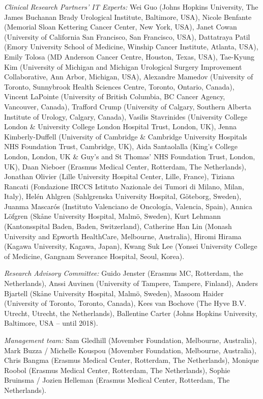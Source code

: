 \emph{Clinical Research Partners’ IT Experts:} Wei Guo (Johns Hopkins University, The James Buchanan Brady Urological Institute, Baltimore, USA), Nicole Benfante (Memorial Sloan Kettering Cancer Center, New York, USA), Janet Cowan (University of California San Francisco, San Francisco, USA), Dattatraya Patil (Emory University School of Medicine, Winship Cancer Institute, Atlanta, USA), Emily Tolosa (MD Anderson Cancer Centre, Houston, Texas, USA), Tae-Kyung Kim (University of Michigan and Michigan Urological Surgery Improvement Collaborative, Ann Arbor, Michigan, USA), Alexandre Mamedov (University of Toronto, Sunnybrook Health Sciences Centre, Toronto, Ontario, Canada), Vincent LaPointe (University of British Columbia, BC Cancer Agency, Vancouver, Canada), Trafford Crump (University of Calgary, Southern Alberta Institute of Urology, Calgary, Canada), Vasilis Stavrinides (University College London \& University College London Hospital Trust, London, UK), Jenna Kimberly-Duffell (University of Cambridge \& Cambridge University Hospitals NHS Foundation Trust, Cambridge, UK), Aida Santaolalla (King's College London, London, UK \& Guy’s and St Thomas’ NHS Foundation Trust, London, UK), Daan Nieboer (Erasmus Medical Center, Rotterdam, The Netherlands), Jonathan Olivier (Lille University Hospital Center, Lille, France), Tiziana Rancati (Fondazione IRCCS Istituto Nazionale dei Tumori di Milano, Milan, Italy), Helén Ahlgren (Sahlgrenska University Hospital, Göteborg, Sweden), Juanma Mascarós (Instituto Valenciano de Oncología, Valencia, Spain), Annica Löfgren (Skåne University Hospital, Malmö, Sweden), Kurt Lehmann (Kantonsspital Baden, Baden, Switzerland), Catherine Han Lin (Monash University and Epworth HealthCare, Melbourne, Australia), Hiromi Hirama (Kagawa University, Kagawa, Japan), Kwang Suk Lee (Yonsei University College of Medicine, Gangnam Severance Hospital, Seoul, Korea). 

\emph{Research Advisory Committee:} Guido Jenster (Erasmus MC, Rotterdam, the Netherlands), Anssi Auvinen (University of Tampere, Tampere, Finland), Anders Bjartell (Skåne University Hospital, Malmö, Sweden), Masoom Haider (University of Toronto, Toronto, Canada), Kees van Bochove (The Hyve B.V. Utrecht, Utrecht, the Netherlands), Ballentine Carter (Johns Hopkins University, Baltimore, USA – until 2018). 

\emph{Management team:} Sam Gledhill (Movember Foundation, Melbourne, Australia), Mark Buzza / Michelle Kouspou (Movember Foundation, Melbourne, Australia), Chris Bangma (Erasmus Medical Center, Rotterdam, The Netherlands), Monique Roobol (Erasmus Medical Center, Rotterdam, The Netherlands), Sophie Bruinsma / Jozien Helleman (Erasmus Medical Center, Rotterdam, The Netherlands).